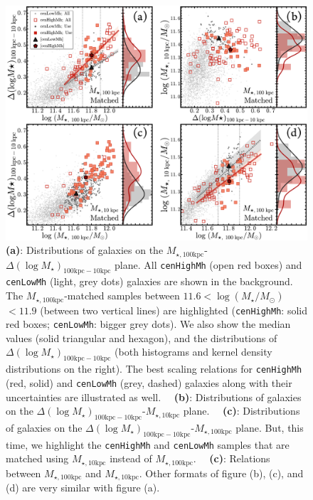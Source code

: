 \documentclass{emulateapj}
\def\rbcg{\texttt{cenHighMh}}
\def\nbcg{\texttt{cenLowMh}}
\def\logms{{$\log (M_{\star}/M_{\odot})$}}
\def\minn{{$M_{\star,10\mathrm{kpc}}$}}
\def\mtot{{$M_{\star,100\mathrm{kpc}}$}}
\begin{document}
\begin{CJK*}{UTF8}{gbsn}

  \begin{figure}[t]
      \centering 
      \includegraphics[width=\textwidth]{fig/redbcg_m100_m10_new}
      \caption{\textbf{(a)}: Distributions of galaxies on the 
          \mtot{}-$\Delta (\log M_{\star})_{100\mathrm{kpc}-10\mathrm{kpc}}$ plane. 
          All \rbcg{} (open red boxes) and \nbcg{} (light, grey dots) galaxies 
          are shown in the background. 
          The \mtot{}-matched samples between $11.6<$\logms{}$<11.9$ (between two 
          vertical lines) are highlighted (\rbcg{}: solid red boxes; 
          \nbcg{}: bigger grey dots). 
          We also show the median values (solid triangular and hexagon), and the
          distributions of $\Delta (\log M_{\star})_{100\mathrm{kpc}-10\mathrm{kpc}}$
          (both histograms and kernel density distributions on the right).
          The best scaling relations for \rbcg{} (red, solid) and 
          \nbcg{} (grey, dashed) galaxies along with their uncertainties 
          are illustrated as well.~~
          \textbf{(b)}: Distributions of galaxies on the 
          $\Delta (\log M_{\star})_{100\mathrm{kpc}-10\mathrm{kpc}}$-\minn{} plane.~~
          \textbf{(c)}: Distributions of galaxies on the 
          $\Delta (\log M_{\star})_{100\mathrm{kpc}-10\mathrm{kpc}}$-\mtot{} plane.
          But, this time, we highlight the \rbcg{} and \nbcg{} samples that are 
          matched using \minn{} instead of \mtot{}.~~
          \textbf{(c)}: Relations between \mtot{} and \minn{}. 
          Other formats of figure (b), (c), and (d) are very similar with figure (a).}
      \label{fig:m100_m10_A}
  \end{figure}


\end{CJK*}
\end{document}

